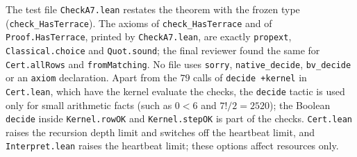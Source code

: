 \documentclass[11pt]{article}
\theoremstyle{definition}
\theoremstyle{remark}
\begin{document}
{\noindent The test file \texttt{CheckA7.lean} restates the theorem with the
frozen type (\texttt{check\_\allowbreak HasTerrace}). The axioms of
\texttt{check\_\allowbreak HasTerrace} and of \texttt{Proof.HasTerrace},
printed by \texttt{CheckA7.lean}, are exactly \texttt{propext},
\texttt{Classical.choice} and \texttt{Quot.sound}; the final reviewer found
the same for \texttt{Cert.allRows} and \texttt{fromMatching}. No file uses
\texttt{sorry}, \texttt{native\_\allowbreak decide},
\texttt{bv\_\allowbreak decide} or an \texttt{axiom} declaration. Apart from
the $79$ calls of \texttt{decide +kernel} in \texttt{Cert.lean}, which have the
kernel evaluate the checks, the \texttt{decide} tactic is used only for small arithmetic facts (such as
$0<6$ and $7!/2=2520$); the Boolean \texttt{decide} inside
\texttt{Kernel.rowOK} and \texttt{Kernel.stepOK} is part of the checks. \texttt{Cert.lean} raises the recursion
depth limit and switches off the heartbeat limit, and
\texttt{Interpret.lean} raises the heartbeat limit; these options affect
resources only.

}
\end{document}
